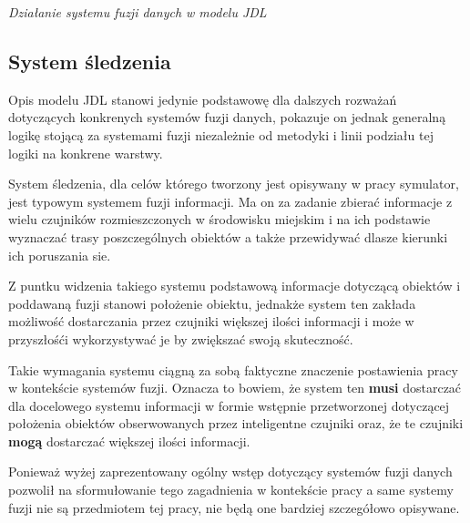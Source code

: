 \par{
\begin{center}
\textit{Działanie systemu fuzji danych w modelu JDL}
\end{center}

\subsection{System śledzenia}
\par{
Opis modelu JDL stanowi jedynie podstawowę dla dalszych rozważań dotyczących konkrenych systemów fuzji danych, pokazuje on jednak generalną logikę stojącą za systemami fuzji niezależnie od metodyki i linii podziału tej logiki na konkrene warstwy.
}
\par{
System śledzenia, dla celów którego tworzony jest opisywany w pracy symulator, jest typowym systemem fuzji informacji. Ma on za zadanie zbierać informacje z wielu czujników rozmieszczonych w środowisku miejskim i na ich podstawie wyznaczać trasy poszczególnych obiektów a także przewidywać dlasze kierunki ich poruszania sie.
}
\par{
Z puntku widzenia takiego systemu podstawową informacje dotyczącą obiektów i poddawaną fuzji stanowi położenie obiektu, jednakże system ten zakłada możliwość dostarczania przez czujniki większej ilości informacji i może w przyszłośći wykorzystywać je by zwiększać swoją skuteczność.
}
\par{
Takie wymagania systemu ciągną za sobą faktyczne znaczenie postawienia pracy w kontekście systemów fuzji. Oznacza to bowiem, że system ten \textbf{musi} dostarczać dla docelowego systemu informacji w formie wstępnie przetworzonej dotyczącej położenia obiektów obserwowanych przez inteligentne czujniki oraz, że te czujniki \textbf{mogą} dostarczać większej ilości informacji.
}
\par{
Ponieważ wyżej zaprezentowany ogólny wstęp dotyczący systemów fuzji danych pozwolił na sformułowanie tego zagadnienia w kontekście pracy a same systemy fuzji nie są przedmiotem tej pracy, nie będą one bardziej szczegółowo opisywane.
}

}
